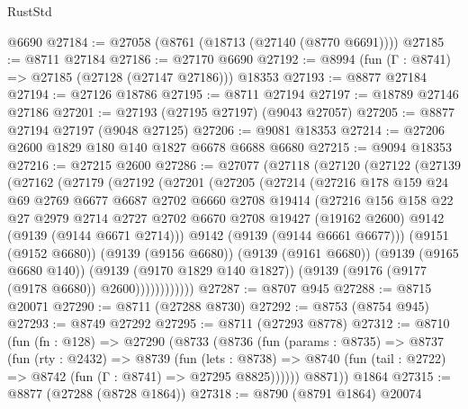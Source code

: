 \begin{lexlean}{RustStd}
\begin{coremodule}
    @6690
@27184 := @27058 (@8761 (@18713 (@27140 (@8770 @6691))))
@27185 := @8711 @27184
@27186 := @27170 @6690
@27192 := @8994 (fun (Γ : @8741) => @27185 (@27128 (@27147 @27186))) @18353
@27193 := @8877 @27184
@27194 := @27126 @18786
@27195 := @8711 @27194
@27197 := @18789 @27146 @27186
@27201 := @27193 (@27195 @27197) (@9043 @27057)
@27205 := @8877 @27194 @27197 (@9048 @27125)
@27206 := @9081 @18353
@27214 := @27206 @2600 @1829 @180 @140 @1827 @6678 @6688 @6680
@27215 := @9094 @18353
@27216 := @27215 @2600
@27286 := @27077
    (@27118
      (@27120
        (@27122
          (@27139
            (@27162
              (@27179
                (@27192
                  (@27201
                    (@27205
                      (@27214
                        (@27216
                          @178
                          @159
                          @24
                          @69
                          @2769
                          @6677
                          @6687
                          @2702
                          @6660
                          @2708
                          @19414
                          (@27216
                            @156
                            @158
                            @22
                            @27
                            @2979
                            @2714
                            @2727
                            @2702
                            @6670
                            @2708
                            @19427
                            (@19162 @2600)
                            @9142
                            (@9139 (@9144 @6671 @2714)))
                          @9142
                          (@9139 (@9144 @6661 @6677)))
                        (@9151 (@9152 @6680))
                        (@9139 (@9156 @6680))
                        (@9139 (@9161 @6680))
                        (@9139 (@9165 @6680 @140))
                        (@9139 (@9170 @1829 @140 @1827))
                        (@9139 (@9176 (@9177 (@9178 @6680)) @2600))))))))))))
@27287 := @8707 @945
@27288 := @8715 @20071
@27290 := @8711 (@27288 @8730)
@27292 := @8753 (@8754 @945)
@27293 := @8749 @27292
@27295 := @8711 (@27293 @8778)
@27312 := @8710
    (fun (fn : @128) =>
    @27290
      (@8733
        (@8736
          (fun (params : @8735) =>
          @8737
            (fun (rty : @2432) =>
            @8739
              (fun (lets : @8738) =>
              @8740 (fun (tail : @2722) => @8742 (fun (Γ : @8741) => @27295 @8825))))))
        @8871))
    @1864
@27315 := @8877 (@27288 (@8728 @1864))
@27318 := @8790 (@8791 @1864) @20074

\end{coremodule}
\end{lexlean}
